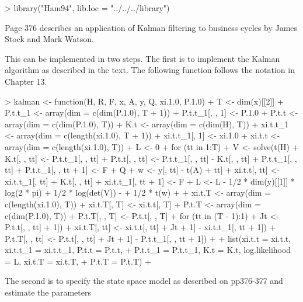 \begin{Schunk}
\begin{Sinput}
> library("Ham94", lib.loc = "../../../library")
\end{Sinput}
\end{Schunk}
Page 376 describes an application of Kalman filtering to business cycles by James Stock and Mark Watson.

This can be implemented in two steps.  The first is to implement the Kalman algorithm as described in the text.  The
following function follows the notation in Chapter 13.
\begin{Schunk}
\begin{Sinput}
> kalman <- function(H, R, F, x, A, y, Q, xi.1.0, P.1.0) {
+     T <- dim(x)[[2]]
+     P.t.t_1 <- array(dim = c(dim(P.1.0), T + 1))
+     P.t.t_1[, , 1] <- P.1.0
+     P.t.t <- array(dim = c(dim(P.1.0), T))
+     K.t <- array(dim = c(dim(H), T))
+     xi.t.t_1 <- array(dim = c(length(xi.1.0), T + 1))
+     xi.t.t_1[, 1] <- xi.1.0
+     xi.t.t <- array(dim = c(length(xi.1.0), T))
+     L <- 0
+     for (tt in 1:T) {
+         V <- solve(t(H) %
+         K.t[, , tt] <- P.t.t_1[, , tt] %
+         P.t.t[, , tt] <- P.t.t_1[, , tt] - K.t[, , tt] %
+             P.t.t_1[, , tt]
+         P.t.t_1[, , tt + 1] <- F %
+             Q
+         w <- y[, tt] - t(A) %
+             tt]
+         xi.t.t[, tt] <- xi.t.t_1[, tt] + K.t[, , tt] %
+         xi.t.t_1[, tt + 1] <- F %
+         L <- L - 1/2 * dim(y)[[1]] * log(2 * pi) + 1/2 * log(det(V)) - 
+             1/2 * t(w) %
+     }
+     xi.t.T <- array(dim = c(length(xi.1.0), T))
+     xi.t.T[, T] <- xi.t.t[, T]
+     P.t.T <- array(dim = c(dim(P.1.0), T))
+     P.t.T[, , T] <- P.t.t[, , T]
+     for (tt in (T - 1):1) {
+         Jt <- P.t.t[, , tt] %
+             1])
+         xi.t.T[, tt] <- xi.t.t[, tt] + Jt %
+             1] - xi.t.t_1[, tt + 1])
+         P.t.T[, , tt] <- P.t.t[, , tt] + Jt %
+             1] - P.t.t_1[, , tt + 1]) %
+     }
+     list(xi.t.t = xi.t.t, xi.t.t_1 = xi.t.t_1, P.t.t = P.t.t, 
+         P.t.t_1 = P.t.t_1, K.t = K.t, log.likelihood = L, xi.t.T = xi.t.T, 
+         P.t.T = P.t.T)
+ }
\end{Sinput}
\end{Schunk}
The second is to specify the state space model as described on pp376-377 and estimate the parameters

